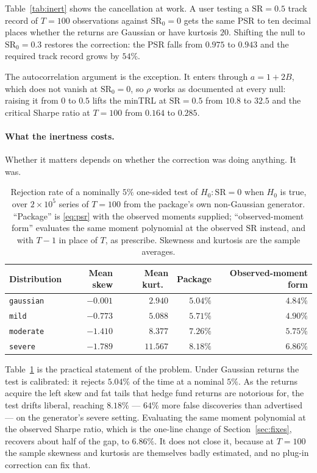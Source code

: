 \documentclass[11pt,a4paper]{article}
\newcommand{\code}[1]{\texttt{#1}}
\newcommand{\SR}{\mathrm{SR}}
\begin{document}
Table~\ref{tab:inert} shows the cancellation at work. A user testing a
$\SR = 0.5$ track record of $T = 100$ observations against $\SR_0 = 0$ gets
the same PSR to ten decimal places whether the returns are Gaussian or have
kurtosis $20$. Shifting the null to $\SR_0 = 0.3$ restores the correction:
the PSR falls from $0.975$ to $0.943$ and the required track record grows by
$54\%$.

The autocorrelation argument is the exception. It enters through $a = 1 + 2B$,
which does not vanish at $\SR_0 = 0$, so $\rho$ works as documented at every
null: raising it from $0$ to $0.5$ lifts the minTRL at $\SR = 0.5$ from
$10.8$ to $32.5$ and the critical Sharpe ratio at $T = 100$ from $0.164$ to
$0.285$.

\paragraph{What the inertness costs.}
Whether it matters depends on whether the correction was doing anything. It
was.

\begin{table}[t]
\centering
\caption{Rejection rate of a nominally $5\%$ one-sided test of $H_0: \SR = 0$
when $H_0$ is true, over $2 \times 10^5$ series of $T = 100$ from the
package's own non-Gaussian generator. ``Package'' is \eqref{eq:psr} with the
observed moments supplied; ``observed-moment form'' evaluates the same moment
polynomial at the observed $\SR$ instead, and with $T-1$ in place of $T$, as
\citet{bailey2012} prescribe. Skewness and kurtosis are the sample averages.}
\label{tab:calib}
\begin{tabular}{lrrrr}
\toprule
Distribution & Mean skew & Mean kurt.\ & Package & Observed-moment form \\
\midrule
\code{gaussian} & $-0.001$ & $2.940$  & $5.04\%$ & $4.84\%$ \\
\code{mild}     & $-0.773$ & $5.088$  & $5.71\%$ & $4.90\%$ \\
\code{moderate} & $-1.410$ & $8.377$  & $7.26\%$ & $5.75\%$ \\
\code{severe}   & $-1.789$ & $11.567$ & $8.18\%$ & $6.86\%$ \\
\bottomrule
\end{tabular}
\end{table}

Table~\ref{tab:calib} is the practical statement of the problem. Under
Gaussian returns the test is calibrated: it rejects $5.04\%$ of the time at a
nominal $5\%$. As the returns acquire the left skew and fat tails that hedge
fund returns are notorious for, the test drifts liberal, reaching $8.18\%$ ---
$64\%$ more false discoveries than advertised --- on the generator's severe
setting. Evaluating the same moment polynomial at the observed Sharpe ratio,
which is the one-line change of Section~\ref{sec:fixes}, recovers about half
of the gap, to $6.86\%$. It does not close it, because at $T = 100$ the
sample skewness and kurtosis are themselves badly estimated, and no
plug-in correction can fix that.
\end{document}
